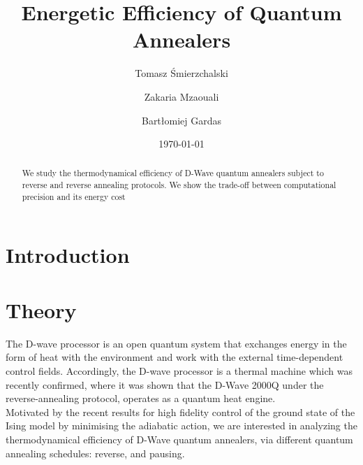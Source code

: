 \documentclass[%
 reprint,
 amsmath,amssymb,
 aps,
]{revtex4-2}
\begin{document}

\title{Energetic Efficiency of Quantum Annealers}%

\author{Tomasz Śmierzchalski}
\author{Zakaria Mzaouali}%
 \author{Bartłomiej Gardas}

\date{\today}%

\begin{abstract}
We study the thermodynamical efficiency of D-Wave quantum annealers subject to reverse and reverse annealing protocols. We show the trade-off between computational precision and its energy cost

\end{abstract}

\maketitle

\section{\label{intro} Introduction}

\section{\label{theory} Theory}
The D-wave processor is an open quantum system that exchanges energy in the form of heat with the environment and work with the external time-dependent control fields. Accordingly, the D-wave processor is a thermal machine which was recently confirmed,  where it was shown that the D-Wave 2000Q under the reverse-annealing protocol, operates as a quantum heat engine.  \\
Motivated by the recent results for high fidelity control of the ground state of the Ising model by minimising the adiabatic action, we are interested in analyzing the thermodynamical efficiency of D-Wave quantum annealers, via different quantum annealing schedules: reverse, and pausing. 
\end{document}
